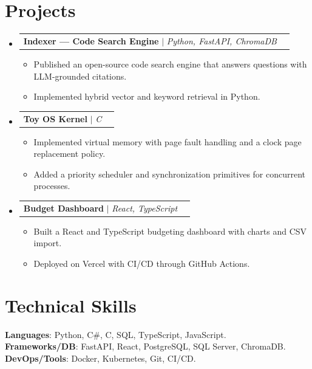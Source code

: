 \documentclass[letterpaper,11pt]{article}
\makeatletter
\newcommand{\resumeItem}[1]{
  \item\small{
    {#1 \vspace{-2pt}}
  }
}
\newcommand{\resumeProjectHeading}[2]{
    \item
    \begin{tabular*}{0.97\textwidth}{l@{\extracolsep{\fill}}r}
      \small#1 & #2 \\
    \end{tabular*}\vspace{-7pt}
}
\newcommand{\resumeSubHeadingListStart}{\begin{itemize}[leftmargin=0.15in, label={}]}
\newcommand{\resumeSubHeadingListEnd}{\end{itemize}}
\newcommand{\resumeItemListStart}{\begin{itemize}}
\newcommand{\resumeItemListEnd}{\end{itemize}\vspace{-6pt}}
\makeatother
\begin{document}
\section{Projects}
    \resumeSubHeadingListStart
  \resumeProjectHeading
  {\textbf{Indexer --- Code Search Engine} $|$ \emph{Python, FastAPI, ChromaDB}}{}
  \resumeItemListStart
    \resumeItem{Published an open-source code search engine that answers questions with LLM-grounded citations.}
    \resumeItem{Implemented hybrid vector and keyword retrieval in Python.}
  \resumeItemListEnd
  \resumeProjectHeading
  {\textbf{Toy OS Kernel} $|$ \emph{C}}{}
  \resumeItemListStart
    \resumeItem{Implemented virtual memory with page fault handling and a clock page replacement policy.}
    \resumeItem{Added a priority scheduler and synchronization primitives for concurrent processes.}
  \resumeItemListEnd
  \resumeProjectHeading
  {\textbf{Budget Dashboard} $|$ \emph{React, TypeScript}}{}
  \resumeItemListStart
    \resumeItem{Built a React and TypeScript budgeting dashboard with charts and CSV import.}
    \resumeItem{Deployed on Vercel with CI/CD through GitHub Actions.}
  \resumeItemListEnd
    \resumeSubHeadingListEnd

\section{Technical Skills}
 \begin{itemize}[leftmargin=0.15in, label={}]
    \small{\item{
     \textbf{Languages}{: Python, C\#, C, SQL, TypeScript, JavaScript.} \\
     \textbf{Frameworks/DB}{: FastAPI, React, PostgreSQL, SQL Server, ChromaDB.} \\
     \textbf{DevOps/Tools}{: Docker, Kubernetes, Git, CI/CD.}
    }}
 \end{itemize}
\end{document}
